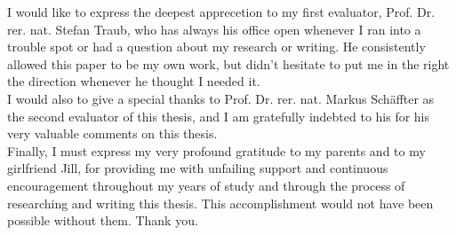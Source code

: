 \setlength\parindent{0pt}

I would like to express the deepest apprecetion to my first evaluator, Prof. Dr. rer. nat. Stefan Traub, who has always his office open whenever I ran into a trouble spot or had a question about my research or writing. He consistently allowed this paper to be my own work, but didn't hesitate to put me in the right the direction whenever he thought I needed it. \\


I would also to give a special thanks to Prof. Dr. rer. nat. Markus Sch{\"a}ffter as the second evaluator of this thesis, and I am gratefully indebted to his for his very valuable comments on this thesis. \\

 


Finally, I must express my very profound gratitude to my parents and to my girlfriend Jill, for providing me with unfailing support and continuous encouragement throughout my years of study and through the process of researching and writing this thesis. This accomplishment would not have been possible without them. Thank you.
